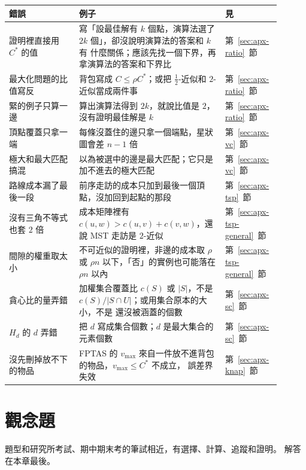 \begin{center}
\begin{tabular}{p{0.24\linewidth}p{0.50\linewidth}p{0.16\linewidth}}
\toprule
錯誤 & 例子 & 見 \\
\midrule
證明裡直接用 $C^*$ 的值 & 寫「設最佳解有 $k$ 個點，演算法選了 $2k$ 個」，卻沒說明演算法的答案和 $k$ 有
什麼關係；應該先找一個下界，再拿演算法的答案和下界比 & 第~\ref{sec:apx-ratio}~節 \\
最大化問題的比值寫反 & 背包寫成 $C \le \rho C^*$；或把 $\frac12$-近似和 $2$-近似當成兩件事 &
第~\ref{sec:apx-ratio}~節 \\
緊的例子只算一邊 & 算出演算法得到 $2k$，就說比值是 $2$，沒有證明最佳解是 $k$ &
第~\ref{sec:apx-ratio}~節 \\
頂點覆蓋只拿一端 & 每條沒蓋住的邊只拿一個端點，星狀圖會差 $n - 1$ 倍 & 第~\ref{sec:apx-vc}~節 \\
極大和最大匹配搞混 & 以為被選中的邊是最大匹配；它只是加不進去的極大匹配 & 第~\ref{sec:apx-vc}~節 \\
路線成本漏了最後一段 & 前序走訪的成本只加到最後一個頂點，沒加回到起點的那段 &
第~\ref{sec:apx-tsp}~節 \\
沒有三角不等式也套 $2$ 倍 & 成本矩陣裡有 $c(u, w) > c(u, v) + c(v, w)$，還說 MST 走訪是 $2$-近似 &
第~\ref{sec:apx-tsp-general}~節 \\
間隙的權重取太小 & 不可近似的證明裡，非邊的成本取 $\rho$ 或 $\rho n$ 以下，「否」的實例也可能落在
$\rho n$ 以內 & 第~\ref{sec:apx-tsp-general}~節 \\
貪心比的量弄錯 & 加權集合覆蓋比 $c(S)$ 或 $|S|$，不是 $c(S)/|S \cap U|$；或用集合原本的大小，不是
還沒被涵蓋的個數 & 第~\ref{sec:apx-sc}~節 \\
$H_d$ 的 $d$ 弄錯 & 把 $d$ 寫成集合個數；$d$ 是最大集合的元素個數 & 第~\ref{sec:apx-sc}~節 \\
沒先刪掉放不下的物品 & FPTAS 的 $v_{\max}$ 來自一件放不進背包的物品，$v_{\max} \le C^*$ 不成立，
誤差界失效 & 第~\ref{sec:apx-knap}~節 \\
\bottomrule
\end{tabular}
\end{center}

\section{觀念題}
\label{sec:apx-exercises}

題型和研究所考試、期中期末考的筆試相近，有選擇、計算、追蹤和證明。 解答在本章最後。

